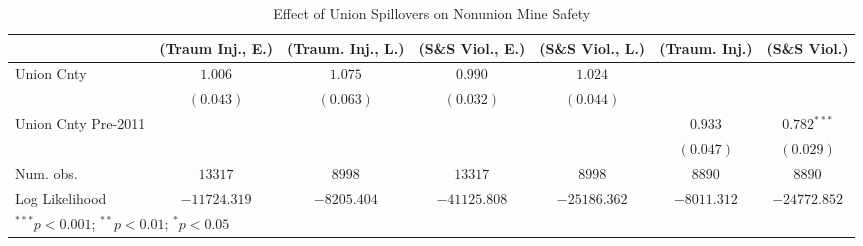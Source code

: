 
\begin{table}
\begin{center}
\begin{tabular}{l c c c c c c}
\hline
 & (Traum Inj., E.) & (Traum. Inj., L.) & (S\&S Viol., E.) & (S\&S Viol., L.) & (Traum. Inj.) & (S\&S Viol.) \\
\hline
Union Cnty          & $1.006$      & $1.075$     & $0.990$      & $1.024$      &             &               \\
                    & $(0.043)$    & $(0.063)$   & $(0.032)$    & $(0.044)$    &             &               \\
Union Cnty Pre-2011 &              &             &              &              & $0.933$     & $0.782^{***}$ \\
                    &              &             &              &              & $(0.047)$   & $(0.029)$     \\
\hline
Num. obs.           & $13317$      & $8998$      & $13317$      & $8998$       & $8890$      & $8890$        \\
Log Likelihood      & $-11724.319$ & $-8205.404$ & $-41125.808$ & $-25186.362$ & $-8011.312$ & $-24772.852$  \\
\hline
\multicolumn{7}{l}{\scriptsize{$^{***}p<0.001$; $^{**}p<0.01$; $^{*}p<0.05$}}
\end{tabular}
\caption{Effect of Union Spillovers on Nonunion Mine Safety}
\label{irr_100employees_union_extern}
\end{center}
\end{table}

